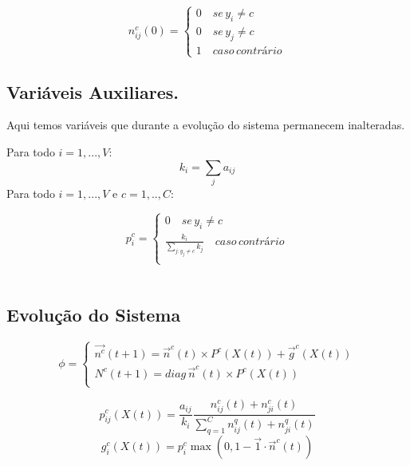 \documentclass[conference]{IEEEtran}
\begin{document}
\begin{equation}
n_{ij}^{c}(0) =
           \begin{cases}
             0 \quad se \, y_{i} \neq c\\
            0 \quad se \, y_{j} \neq c\\
            1 \quad caso \, contrário
        \end{cases}
\end{equation}


\subsection{Variáveis Auxiliares.}
 Aqui temos variáveis que durante a evolução do sistema permanecem inalteradas.
 
Para todo $i=1,...,V$:
\begin{equation}
    k_{i}=\displaystyle\sum_{j} a_{ij}
\end{equation}
 Para todo $i=1,...,V$ e $c=1,..,C$:
 
 \begin{equation}
p_{i}^{c} =
           \begin{cases}
             0 \quad se \, y_{i} \neq c  \\
            \frac{k_{i}}{\sum_{j:y_{j} \neq c}k_{j}}  \quad caso  \, contrário \\
        \end{cases}
\end{equation}
 \\
\subsection{Evolução do Sistema}
 \begin{equation}
\phi =
           \begin{cases}
            \vec{n^{c}}(t+1)= \vec{n}^{c}(t) \times P^{c}(X(t)) + \vec{g}^{c}(X(t)) \\
            N^{c}(t+1) = diag \, \vec{n}^{c}(t) \times P^{c}(X(t)) \\
        \end{cases}
\end{equation}

\begin{equation}
    p^{c}_{ij}(X(t)) = \frac{a_{ij}}{k_{i}}
    \frac{n_{ij}^{c}(t)+ n_{ji}^{c}(t)}{\sum^{C}_{q=1}n_{ij}^{q}(t) + n_{ji}^{q}(t)}
\end{equation}
\begin{equation}
    g_{i}^{c}(X(t)) = p_{i}^{c} \max(0,1-\vec{1} \cdot \vec{n}^{c}(t))
\end{equation}
\end{document}
